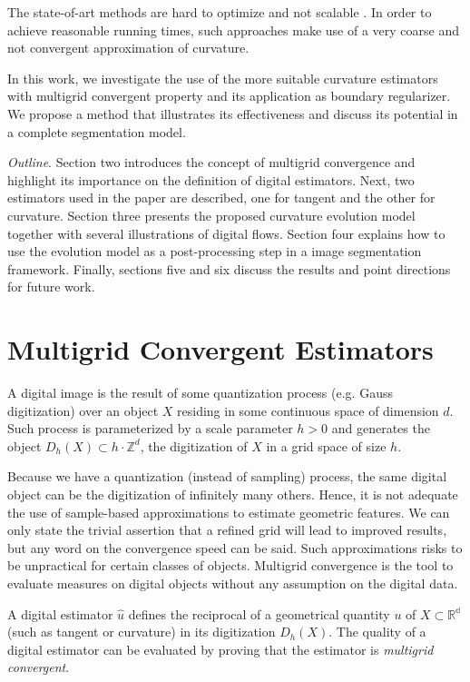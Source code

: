 \documentclass[runningheads]{llncs}
\begin{document}
The state-of-art methods are hard to optimize and  not scalable \cite{schoenemann09,nieuwenhuis14}. In order to achieve reasonable running times, such approaches make use of a very coarse and not convergent approximation of curvature.

In this work, we investigate the use of the more suitable curvature estimators with multigrid convergent property and its application as boundary regularizer. We propose a method that illustrates its effectiveness and discuss its potential in a complete segmentation model. 

\textit{Outline}. Section two introduces the concept of multigrid convergence and highlight its importance on the definition of digital estimators. Next, two estimators used in the paper are described, one for tangent and the other for curvature. Section three presents the proposed curvature evolution model together with several illustrations of digital flows. Section four explains how to use the evolution model as a post-processing step in a image segmentation framework. Finally, sections five and six discuss the results and point directions for future work.




\section{Multigrid Convergent Estimators}



A digital image is the result of some quantization process (e.g. Gauss digitization) over an object $X$ residing in some continuous space of dimension $d$. Such process is parameterized by a scale parameter $h>0$ and generates the object $D_h(X) \subset h \cdot \mathbb{Z}^d$, the digitization of $X$ in a grid space of size $h$. 

Because we have a quantization (instead of sampling) process, the same digital object can be the digitization of infinitely many others. Hence, it is not adequate the use of sample-based approximations to estimate geometric features. We can only state the trivial assertion that a refined grid will lead to improved results, but any word on the convergence speed can be said. Such approximations risks to be unpractical for certain classes of objects. Multigrid convergence is the tool to evaluate measures on digital objects without any assumption on the digital data. 

A digital estimator $\hat{u}$ defines  the reciprocal of a geometrical quantity $u$ of $X \subset \mathbb{R^d}$ (such as tangent or curvature) in its digitization $D_h(X)$. The quality of a digital estimator can be evaluated by proving that the estimator is \textit{multigrid convergent}. 
	
\end{document}
